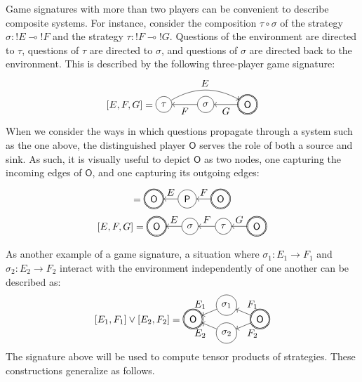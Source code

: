 \documentclass[format=sigplan,authordraft]{acmart}
\newcommand{\kw}[1]{\ensuremath{ \mathsf{#1} }}
\begin{document}
Game signatures with more than two players
can be convenient to describe composite systems.
For instance,
consider the composition $\tau \circ \sigma$ of
the strategy $\sigma : {!E} \multimap {!F}$ and
the strategy $\tau : {!F} \multimap {!G}$.
Questions of the environment are directed to $\tau$,
questions of $\tau$ are directed to $\sigma$,
and questions of $\sigma$ are directed back to the environment.
This is described by the following three-player game signature:
\[
  [E,F,G] =
  \begin{tikzpicture}[baseline=(O.base),scale=1.5]
    \node[circle,double,draw] (O) at (1,0) {$\kw{O}$};
    \node[circle,draw] (P2) at (0,0) {$\sigma$};
    \node[circle,draw] (P1) at (-1,0) {$\tau$};
    \path[->] (O) edge node[below] {$G$} (P2);
    \path[->] (P2) edge node[below] {$F$} (P1);
    \path[->] (P1) edge[bend left] node[above] {$E$} (O);
  \end{tikzpicture}
\]
When we consider the ways in which questions propagate
through a system such as the one above,
the distinguished player $\kw{O}$ serves the role
of both a source and sink.
As such, it is visually useful
to depict $\kw{O}$ as two nodes,
one capturing the incoming edges of $\kw{O}$, and
one capturing its outgoing edges:
\begin{gather*}
  [E,F] =
  \begin{tikzpicture}[baseline=(O1.base),scale=1.2]
    \node[circle,double,draw] (O1) at (1,0) {$\kw{O}$};
    \node[circle,draw] (P) at (0,0) {$\kw{P}$};
    \node[circle,double,draw] (O2) at (-1,0) {$\kw{O}$};
    \path[->] (O1) edge node[above] {$F$} (P);
    \path[->] (P) edge node[above] {$E$} (O2);
  \end{tikzpicture} \\
  [E,F,G] =
  \begin{tikzpicture}[baseline=(O1.base),scale=1.2]
    \node[circle,double,draw] (O1) at (0,0) {$\kw{O}$};
    \node[circle,draw] (P1) at (-1,0) {$\tau$};
    \node[circle,draw] (P2) at (-2,0) {$\sigma$};
    \node[circle,double,draw] (O2) at (-3,0) {$\kw{O}$};
    \path[->] (O1) edge node[above] {$G$} (P1);
    \path[->] (P1) edge node[above] {$F$} (P2);
    \path[->] (P2) edge node[above] {$E$} (O2);
  \end{tikzpicture}
\end{gather*}

As another example of a game signature,
a situation where
$\sigma_1 : E_1 \rightarrow F_1$ and
$\sigma_2 : E_2 \rightarrow F_2$
interact with the environment
independently of one another
can be described as:
\[
  [E_1,F_1] \vee [E_2,F_2] =
  \begin{tikzpicture}[baseline=(O.base),xscale=1.2]
    \node[circle,draw,double] (O1) at (+1,0) {$\kw{O}$};
    \node[circle,draw,double] (O2) at (-1,0) {$\kw{O}$};
    \node[circle,draw] (P1) at (0,+0.5) {$\sigma_1$};
    \node[circle,draw] (P2) at (0,-0.5) {$\sigma_2$};
    \path[->] (O1) edge node[auto=right] {$F_1$} (P1);
    \path[->] (P1) edge node[auto=right] {$E_1$} (O2);
    \path[->] (O1) edge node[auto=left] {$F_2$} (P2);
    \path[->] (P2) edge node[auto=left] {$E_2$} (O2);
  \end{tikzpicture}
\]
The signature above will be used to compute
tensor products of strategies.
These constructions generalize as follows.
\end{document}
